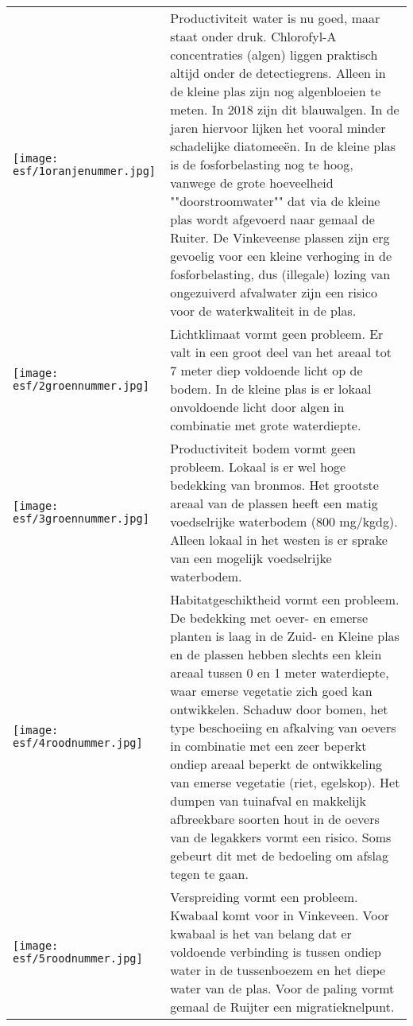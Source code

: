 \documentclass[12pt]{article}\usepackage[]{graphicx}\usepackage[]{color}
\begin{document}
\begin{tcbposter}
{\begin{tabular}{p{}m{}}
  \T\texttt{[image: esf/1oranjenummer.jpg]} & Productiviteit water is nu goed, maar staat onder druk. Chlorofyl-A concentraties  (algen) liggen praktisch altijd onder de detectiegrens. Alleen in de kleine plas zijn nog algenbloeien te meten. In 2018 zijn dit blauwalgen. In de jaren hiervoor lijken het vooral minder schadelijke diatomeeën. In de kleine plas is de fosforbelasting nog te hoog, vanwege de grote hoeveelheid ""doorstroomwater"" dat via de kleine plas wordt afgevoerd naar gemaal de Ruiter. De Vinkeveense plassen zijn erg gevoelig voor een kleine verhoging in de fosforbelasting, dus (illegale) lozing van ongezuiverd afvalwater zijn een risico voor de waterkwaliteit in de plas. \\
  \T\texttt{[image: esf/2groennummer.jpg]} & Lichtklimaat vormt geen probleem. Er valt in een groot deel van het areaal tot 7 meter diep voldoende licht op de bodem. In de kleine plas is er lokaal onvoldoende licht door algen in combinatie met grote waterdiepte.\\
  \T\texttt{[image: esf/3groennummer.jpg]} & Productiviteit bodem vormt geen probleem. Lokaal is er wel hoge bedekking van bronmos. Het grootste areaal van de plassen heeft een matig voedselrijke waterbodem (800 mg/kgdg). Alleen lokaal in het westen is er sprake van een mogelijk voedselrijke waterbodem.\\
  \T\texttt{[image: esf/4roodnummer.jpg]} & Habitatgeschiktheid vormt een probleem. De bedekking met oever- en emerse planten is laag in de Zuid- en Kleine plas en de plassen hebben slechts een klein areaal tussen 0 en 1 meter waterdiepte, waar emerse vegetatie zich goed kan ontwikkelen. Schaduw door bomen, het type beschoeiing en afkalving van oevers in combinatie met een zeer beperkt ondiep areaal beperkt de ontwikkeling van emerse vegetatie (riet, egelskop). Het dumpen van tuinafval en makkelijk afbreekbare soorten hout in de oevers van de legakkers vormt een risico. Soms gebeurt dit met de bedoeling om afslag tegen te gaan.\\
  \T\texttt{[image: esf/5roodnummer.jpg]} & Verspreiding vormt een probleem. Kwabaal komt voor in Vinkeveen. Voor kwabaal is het van belang dat er voldoende verbinding is tussen ondiep water in de tussenboezem en het diepe water van de plas. Voor de paling vormt gemaal de Ruijter een migratieknelpunt.\\

\end{tabular}}
\end{tcbposter}
\end{document}
